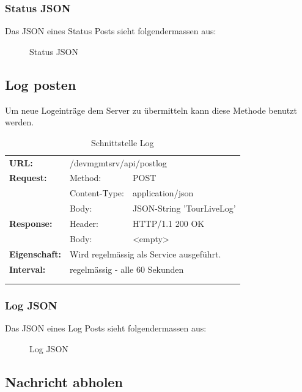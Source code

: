 \subsubsection{Status JSON}

Das JSON eines Status Posts sieht folgendermassen aus:

\begin{figure}[H]
	\centering
	
	\caption{Status JSON}
\end{figure}


\subsection{Log posten}

Um neue Logeinträge dem Server zu übermitteln kann diese Methode benutzt werden.

{\renewcommand{\arraystretch}{1}
    \begin{longtable}{ p{2.5cm} p{3.5cm} p{6cm}}
	\textbf{URL:} & \multicolumn{2}{p{10cm}}{/devmgmtsrv/api/postlog} \\
	\textbf{Request:} & Method: & POST \\
		& Content-Type: & application/json \\
		& Body: & JSON-String 'TourLiveLog' \\
	\textbf{Response:} &  Header: & HTTP/1.1 200 OK \\
		& Body: & <empty>	\\
	\textbf{Eigenschaft:} &  \multicolumn{2}{p{10cm}}{Wird regelmässig als Service ausgeführt.}\\ 
	\textbf{Interval:} &  \multicolumn{2}{p{10cm}}{regelmässig - alle 60 Sekunden}\\
	\\
\caption{Schnittstelle Log}
\end{longtable}}

\subsubsection{Log JSON}

Das JSON eines Log Posts sieht folgendermassen aus:

\begin{figure}[H]
	\centering
	
	\caption{Log JSON}
\end{figure}

\subsection{Nachricht abholen}

